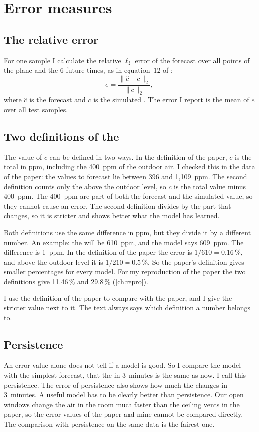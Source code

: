 \section{Error measures}
\subsection*{The relative error}
For one sample I calculate the relative $\ell_2$ error of the forecast over all points of the plane and the
6 future times, as in equation~12 of \citet{bian2025}:
\begin{equation}
  e = \frac{\|\hat{c} - c\|_2}{\|c\|_2},
\end{equation}
where $\hat{c}$ is the forecast and $c$ is the simulated \cotwo{}. The error I report is the mean of $e$ over all
test samples.

\subsection*{Two definitions of the \cotwo{}}
The value of $c$ can be defined in two ways. In the definition of the paper, $c$ is the total \cotwo{} in ppm,
including the 400~ppm of the outdoor air. I checked this in the data of the paper: the values to forecast lie
between 396 and 1,109~ppm. The second definition counts only the \cotwo{} above the outdoor level, so $c$ is
the total value minus 400~ppm. The 400~ppm are part of both the forecast and the simulated value, so they cannot
cause an error. The second definition divides by the part that changes, so it is stricter and shows better what the
model has learned.

Both definitions use the same difference in ppm, but they divide it by a different number. An example: the
\cotwo{} will be 610~ppm, and the model says 609~ppm. The difference is 1~ppm. In the definition of the paper
the error is $1/610 = 0.16\,\%$, and above the outdoor level it is $1/210 = 0.5\,\%$. So the paper's definition
gives smaller percentages for every model. For my reproduction of the paper the two definitions give 11.46\,\%
and 29.8\,\% (\cref{ch:repro}).

I use the definition of the paper to compare with the paper, and I give the stricter value next to it. The text
always says which definition a number belongs to.

\subsection*{Persistence}
An error value alone does not tell if a model is good. So I compare the model with the simplest forecast, that
the \cotwo{} in 3~minutes is the same as now. I call this persistence. The error of persistence also shows how
much the \cotwo{} changes in 3~minutes. A useful model has to be clearly better than persistence. Our open
windows change the air in the room much faster than the ceiling vents in the paper, so the error values of the
paper and mine cannot be compared directly. The comparison with persistence on the same data is the fairest
one.

